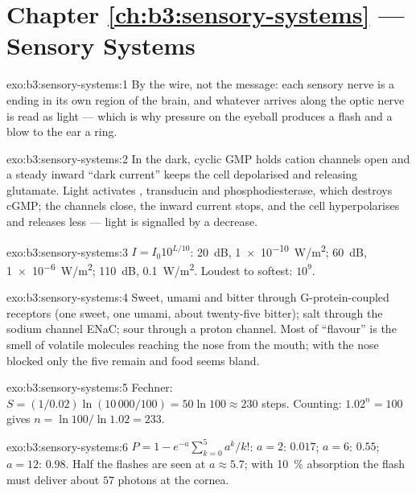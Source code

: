 \section*{Chapter \ref{ch:b3:sensory-systems} --- Sensory Systems}

\begin{solution}{exo:b3:sensory-systems:1}
By the wire, not the message: each sensory nerve is a 
ending in its own region of the brain, and whatever arrives along the
optic nerve is read as light --- which is why pressure on the eyeball
produces a flash and a blow to the ear a ring.
\end{solution}

\begin{solution}{exo:b3:sensory-systems:2}
In the dark, cyclic GMP holds cation channels open and a steady inward
``dark current'' keeps the cell depolarised and releasing glutamate.
Light activates , transducin and phosphodiesterase, which
destroys cGMP; the channels close, the inward current stops, and the
cell hyperpolarises and releases less --- light is signalled by a
decrease.
\end{solution}

\begin{solution}{exo:b3:sensory-systems:3}
$I = I_{0}10^{L/10}$: \qty{20}{dB}, \qty{1e-10}{W/m^2}; \qty{60}{dB},
\qty{1e-6}{W/m^2}; \qty{110}{dB}, \qty{0.1}{W/m^2}. Loudest to softest:
$10^{9}$.
\end{solution}

\begin{solution}{exo:b3:sensory-systems:4}
Sweet, umami and bitter through G-protein-coupled receptors (one
sweet, one umami, about twenty-five bitter); salt through the sodium
channel ENaC; sour through a proton channel. Most of ``flavour'' is
the smell of volatile molecules reaching the nose from the mouth; with
the nose blocked only the five  remain and food seems bland.
\end{solution}

\begin{solution}{exo:b3:sensory-systems:5}
Fechner: $S = (1/0.02)\ln(10\,000/100) = 50\ln 100 \approx 230$ steps.
Counting: $1.02^{n} = 100$ gives $n = \ln 100/\ln 1.02 = 233$.
\end{solution}

\begin{solution}{exo:b3:sensory-systems:6}
$P = 1 - e^{-a}\sum_{k=0}^{5}a^{k}/k!$: $a = 2$: $0.017$; $a = 6$:
$0.55$; $a = 12$: $0.98$. Half the flashes are seen at $a \approx 5.7$;
with \qty{10}{\%} absorption the flash must deliver about $57$
photons at the cornea.
\end{solution}

